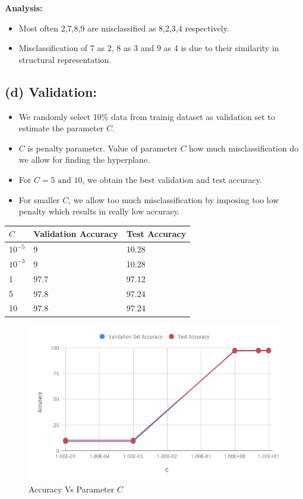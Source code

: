 \documentclass[a4 paper]{article}
\begin{document}
	\textbf{Analysis:}
	\begin{itemize}
	\item Most often 2,7,8,9 are misclassified as 8,2,3,4 respectively.
	\item Misclassification of 7 as 2, 8 as 3 and 9 as 4 is due to their similarity in structural representation.
	\end{itemize}

\subsection*{(d) Validation:}
	
	\begin{itemize}
		\item We randomly select 10\% data from trainig dataset as validation set to estimate the parameter $C$.
		\item $C$ is penalty parameter. Value of parameter $C$ how much misclassification do we allow for finding the hyperplane.
		\item For $C = 5 \text{ and } 10$, we obtain the best validation and test accuracy.
		\item For smaller $C$, we allow too much misclassification by imposing too low penalty which results in really low accuracy.
	\end{itemize}

	\hskip4.0cm\begin{tabular}{ |p{1cm}||p{2cm}|p{2cm}|}
	 \hline $C$ & Validation Accuracy & Test Accuracy\\
	 \hline
	 	$10^{-5}$	&9	& 10.28\\
		$10^{-3}$	&9	& 10.28\\
		1		&97.7	& 97.12\\
		5		&97.8	& 97.24\\
		10		&97.8	& 97.24\\
	 \hline
	\end{tabular}

	\begin{figure}[H]
		\centering %
		\includegraphics[width=150mm]{extra/chart.png}
		\caption{Accuracy Vs Parameter $C$\label{MIMD}}
	\end{figure}
\end{document}
